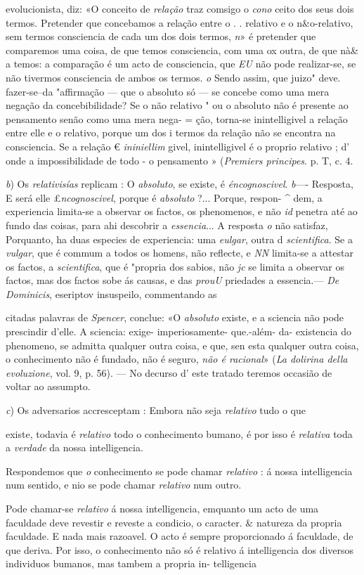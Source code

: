 evolucionista, diz: «O conceito de \emph{relação} traz comsigo o \emph{cono} ceito dos seus dois termos. Pretender que concebamos a relação entre o . . relativo e o n\&o-relativo, sem termos consciencia de cada um dos dois termos, \emph{n}» é pretender que comparemos uma coisa, de que temos consciencia, com uma ox outra, de que nà\& a temos: a comparação é um acto de consciencia, que \emph{EU} não pode realizar-se, se não tivermos consciencia de ambos os termos. \emph{o} Sendo assim, que juizo" deve. fazer-se--da "affirmação --- que o absoluto só --- se concebe como uma mera negação da concebibilidade? Se o não relativo " ou o absoluto não é presente ao pensamento senão como uma mera nega- = ção, torna-se inintelligivel a relação entre elle e o relativo, porque um dos i termos da relação não se encontra na consciencia. Se a relação € \emph{ininiellim} givel, inintelligivel é o proprio relativo ; d' onde a impossibilidade de todo - o pensamento » (\emph{Premiers principes}. p. T, c. 4.\par \emph{b}) Os \emph{relativisías} replicam : O \emph{absoluto}, se existe, é \emph{éncognoscivel}. \emph{b}---- Resposta, E será elle £\emph{ncognoscivel}, porque é \emph{absoluto} ?... Porque, respon- \textasciicircum{} dem, a experiencia limita-se a observar os factos, os phenomenos, e não \emph{id} penetra até ao fundo das coisas, para ahi descobrir a \emph{essencia}... A resposta \textbar{}\emph{o} não satisfaz, Porquanto, ha duas especies de experiencia: uma \emph{eulgar}, outra d \emph{scientifica}. Se a \emph{vulgar}, que é commum a todos os homens, não reflecte, e \emph{NN} limita-se a attestar os factos, a \emph{scientifica}, que é "propria dos sabios, não \emph{jc} se limita a observar os factos, mas dos factos sobe ás causas, e das \emph{prouU} priedades a essencia.--- \emph{De Dominicis}, eseriptov insuspeilo, commentando as\par citadas palavras de \emph{Spencer}, conclue: «O \emph{absoluto} existe, e a sciencia não pode prescindir d'elle. A sciencia: exige- imperiosamente- que.-além- da- existencia do phenomeno, se admitta qualquer outra coisa, e que, sen esta qualquer outra coisa, o conhecimento não é fundado, não é seguro, \emph{não é racional}» (\emph{La dolirina della evoluzione}, vol. 9, p. 56). --- No decurso d' este tratado teremos occasião de voltar ao assumpto.\par \emph{c}) Os adversarios accresceptam : Embora não seja \emph{relativo} tudo o que\par existe, todavia é \emph{relativo} todo o conhecimento bumano, é por isso é \emph{relativa} toda a \emph{verdade} da nossa intelligencia.\par Respondemos que \emph{o} conhecimento se pode chamar \emph{relativo} : á nossa intelligencia num sentido, e nio se pode chamar \emph{relativo} num outro.\par Pode chamar-se \emph{relativo} á nossa intelligencia, emquanto um acto de uma faculdade deve revestir e reveste a condicio, o caracter. \& natureza da propria faculdade. E nada mais razoavel. O acto é sempre proporcionado á faculdade, de que deriva. Por isso, o conhecimento não só é relativo á intelligencia dos diversos individuos bumanos, mas tambem a propria in- telligencia 